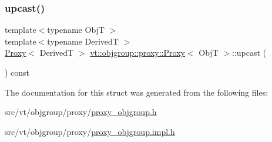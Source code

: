 \mbox{\label{structvt_1_1objgroup_1_1proxy_1_1_proxy_a10217747f1bdd8b59e6f5f76290de8e0}} 
\subsubsection{\texorpdfstring{upcast()}{upcast()}}
{\footnotesize\ttfamily template$<$typename ObjT $>$ \\
template$<$typename DerivedT $>$ \\
\hyperlink{structvt_1_1objgroup_1_1proxy_1_1_proxy}{Proxy}$<$ DerivedT $>$ \hyperlink{structvt_1_1objgroup_1_1proxy_1_1_proxy}{vt\+::objgroup\+::proxy\+::\+Proxy}$<$ ObjT $>$\+::upcast (\begin{DoxyParamCaption}{ }\end{DoxyParamCaption}) const}



The documentation for this struct was generated from the following files\+:\begin{DoxyCompactItemize}
\item 
src/vt/objgroup/proxy/\hyperlink{proxy__objgroup_8h}{proxy\+\_\+objgroup.\+h}\item 
src/vt/objgroup/proxy/\hyperlink{proxy__objgroup_8impl_8h}{proxy\+\_\+objgroup.\+impl.\+h}\end{DoxyCompactItemize}
